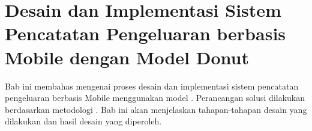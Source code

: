 \chapter{Desain dan Implementasi Sistem Pencatatan Pengeluaran berbasis Mobile dengan Model Donut}
\label{chapter:desain-implementasi}
Bab ini membahas mengenai proses desain dan implementasi sistem pencatatan pengeluaran berbasis Mobile menggunakan model \donut. Perancangan solusi dilakukan berdasarkan metodologi \dsrm. Bab ini akan menjelaskan tahapan-tahapan desain yang dilakukan dan hasil desain yang diperoleh.





